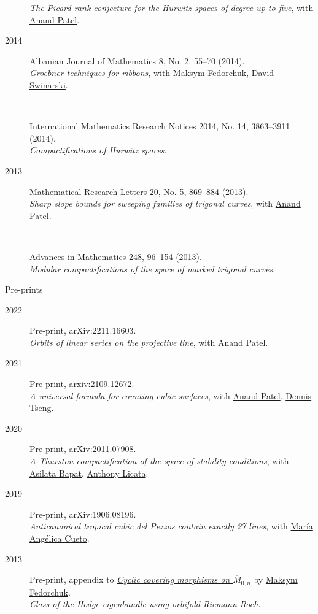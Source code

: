 \documentclass[11pt]{article}
\begin{document}
\begin{description}
\emph{The Picard rank conjecture for the Hurwitz spaces of degree up to five}, with \href{https://www2.bc.edu/anand-p-patel/}{Anand Patel}.
\item[{2014}] Albanian Journal of Mathematics 8, No. 2, 55--70 (2014).\\[0pt]
\emph{Groebner techniques for ribbons}, with \href{https://www2.bc.edu/maksym-fedorchuk/}{Maksym Fedorchuk}, \href{http://faculty.fordham.edu/dswinarski/}{David Swinarski}.
\item[{---}] International Mathematics Research Notices 2014, No. 14, 3863--3911 (2014).\\[0pt]
\emph{Compactifications of Hurwitz spaces}.
\item[{2013}] Mathematical Research Letters 20, No. 5, 869--884 (2013).\\[0pt]
\emph{Sharp slope bounds for sweeping families of trigonal curves}, with \href{https://sites.google.com/view/anand-patel}{Anand Patel}.
\item[{---}] Advances in Mathematics 248, 96--154 (2013).\\[0pt]
\emph{Modular compactifications of the space of marked trigonal curves}.
\end{description}

\begin{description}
\item[{Pre-prints}] 
\end{description}
\begin{description}
\item[{2022}] Pre-print, arXiv:2211.16603.\\[0pt]
\emph{Orbits of linear series on the projective line}, with \href{https://sites.google.com/view/anand-patel}{Anand Patel}.
\item[{2021}] Pre-print, arxiv:2109.12672.\\[0pt]
\emph{A universal formula for counting cubic surfaces}, with \href{https://sites.google.com/view/anand-patel}{Anand Patel}, \href{https://sites.google.com/view/dennis-tseng}{Dennis Tseng}.
\item[{2020}] Pre-print, arXiv:2011.07908.\\[0pt]
\emph{A Thurston compactification of the space of stability conditions}, with \href{https://asilata.github.io/}{Asilata Bapat}, \href{https://maths-people.anu.edu.au/\~licatat/}{Anthony Licata}.
\item[{2019}] Pre-print, arXiv:1906.08196.\\[0pt]
\emph{Anticanonical tropical cubic del Pezzos contain exactly 27 lines}, with \href{https://people.math.osu.edu/cueto.5/}{María Angélica Cueto}.
\item[{2013}] Pre-print, appendix to \href{https://drive.google.com/file/d/1wq-Fh3DiqODc51t-J0phIexVF7B4lxsY/view}{\emph{Cyclic covering morphisms on \(\overline M_{0,n}\)}} by \href{https://www2.bc.edu/maksym-fedorchuk/}{Maksym Fedorchuk}.\\[0pt]
\emph{Class of the Hodge eigenbundle using orbifold Riemann-Roch}.
\end{description}
\end{document}

